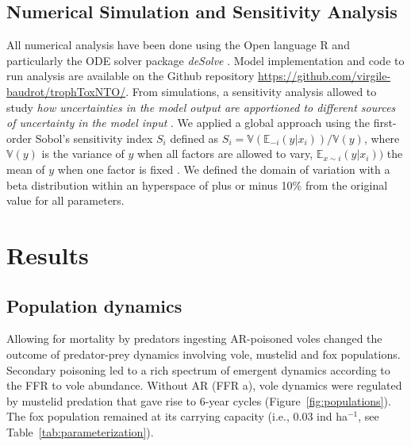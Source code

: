 \documentclass[11pt]{article}
\begin{document}
\subsection{Numerical Simulation and Sensitivity Analysis}

All numerical analysis have been done using the Open language R and particularly the ODE solver package \textit{deSolve} \citep{Soetaert2010}. Model implementation and code to run analysis are available on the Github repository \url{https://github.com/virgile-baudrot/trophToxNTO/}.
%
From simulations, a sensitivity analysis allowed to study \textit{how uncertainties in the model output are apportioned to different sources of uncertainty in the model input} \citep{Saltelli2019}.
%
We applied a global approach using the first-order Sobol's sensitivity index $S_i$ defined as $S_i = \mathbb{V}(\mathbb{E}_{-i}(y \vert x_i)) / \mathbb{V}(y)$, where $\mathbb{V}(y)$ is the variance of $y$ when all factors are allowed to vary, $\mathbb{E}_{x\sim i}(y \vert x_i))$ the mean of $y$ when one factor is fixed \citep{Sobol1993}. We defined the domain of variation with a beta distribution within an hyperspace of plus or minus 10\% from the original value for all parameters.

\section{Results}

\subsection{Population dynamics}

Allowing for mortality by predators ingesting AR-poisoned voles changed the outcome of predator-prey dynamics involving vole, mustelid and fox populations. Secondary poisoning led to a rich spectrum of emergent dynamics according to the FFR to vole abundance.  
Without AR (FFR a), vole dynamics were regulated by mustelid predation that gave rise to 6-year cycles (Figure~\ref{fig:populations}). The fox population remained at its carrying capacity (i.e., 0.03 ind ha$^{-1}$, see Table~\ref{tab:parameterization}).  
\end{document}
